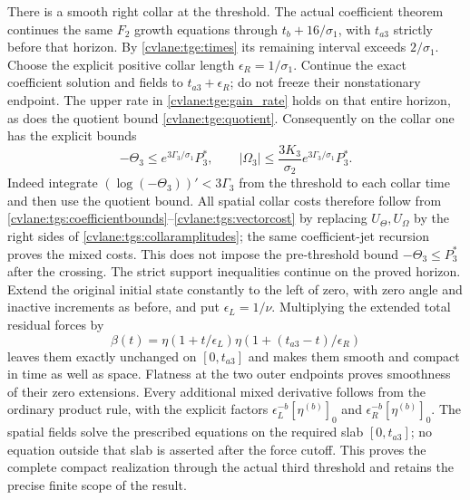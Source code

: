 There is a smooth right collar at the threshold. The actual
coefficient theorem continues the same $F_2$ growth equations
through $t_b+16/\sigma_1$, with $t_{a3}$ strictly before that
horizon. By \eqref{cvlane:tge:times} its remaining interval exceeds
$2/\sigma_1$. Choose the explicit positive collar length
$\epsilon_R=1/\sigma_1$.
Continue the exact coefficient solution and fields to
$t_{a3}+\epsilon_R$; do not freeze their nonstationary endpoint.
The upper rate in \eqref{cvlane:tge:gain_rate} holds on that entire
horizon, as does the quotient bound \eqref{cvlane:tge:quotient}.
Consequently on the collar one has the explicit bounds
\begin{equation}\label{cvlane:tgs:collaramplitudes}
 -\Theta_3\leq e^{3\Gamma_3/\sigma_1}P_3^*,\qquad
 |\Omega_3|\leq
       \frac{3K_3}{\sigma_2}e^{3\Gamma_3/\sigma_1}P_3^*.
\end{equation}
Indeed integrate $(\log(-\Theta_3))'<3\Gamma_3$ from the
threshold to each collar time and then use the quotient bound.
All spatial collar costs therefore follow from
\eqref{cvlane:tgs:coefficientbounds}--\eqref{cvlane:tgs:vectorcost} by replacing
$U_\Theta,U_\Omega$ by the right sides of
\eqref{cvlane:tgs:collaramplitudes}; the same coefficient-jet recursion
proves the mixed costs. This does not impose the pre-threshold
bound $-\Theta_3\leq P_3^*$ after the crossing.
The strict support inequalities continue on the proved horizon.
Extend the original initial state constantly to the left of zero,
with zero angle and inactive increments as before, and put
$\epsilon_L=1/\nu$.
Multiplying the extended total residual forces by
\begin{equation}\label{cvlane:tgs:timecutoff}
 \beta(t)=\eta(1+t/\epsilon_L)
                  \eta(1+(t_{a3}-t)/\epsilon_R)
\end{equation}
leaves them exactly unchanged on $[0,t_{a3}]$ and makes them
smooth and compact in time as well as space. Flatness at the two
outer endpoints proves smoothness of their zero extensions.
Every additional mixed derivative follows from the ordinary
product rule, with the explicit factors
$\epsilon_L^{-b}[\eta^{(b)}]_0$ and
$\epsilon_R^{-b}[\eta^{(b)}]_0$.
The spatial fields solve the prescribed equations on the required
slab $[0,t_{a3}]$; no equation outside that slab is asserted after
the force cutoff. This proves the complete compact realization
through the actual third threshold and retains the precise finite
scope of the result.


